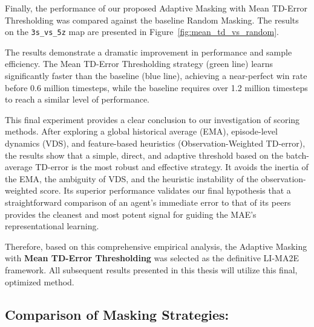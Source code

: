 Finally, the performance of our proposed Adaptive Masking with Mean TD-Error Thresholding was compared against the baseline Random Masking. The results on the \texttt{3s\_vs\_5z} map are presented in Figure~\ref{fig:mean_td_vs_random}.

The results demonstrate a dramatic improvement in performance and sample efficiency. The Mean TD-Error Thresholding strategy (green line) learns significantly faster than the baseline (blue line), achieving a near-perfect win rate before 0.6 million timesteps, while the baseline requires over 1.2 million timesteps to reach a similar level of performance.

This final experiment provides a clear conclusion to our investigation of scoring methods. After exploring a global historical average (EMA), episode-level dynamics (VDS), and feature-based heuristics (Observation-Weighted TD-error), the results show that a simple, direct, and adaptive threshold based on the batch-average TD-error is the most robust and effective strategy. It avoids the inertia of the EMA, the ambiguity of VDS, and the heuristic instability of the observation-weighted score. Its superior performance validates our final hypothesis that a straightforward comparison of an agent's immediate error to that of its peers provides the cleanest and most potent signal for guiding the MAE's representational learning.

Therefore, based on this comprehensive empirical analysis, the Adaptive Masking with \textbf{Mean TD-Error Thresholding} was selected as the definitive LI-MA2E framework. All subsequent results presented in this thesis will utilize this final, optimized method.
\subsection{Comparison of Masking Strategies:}

